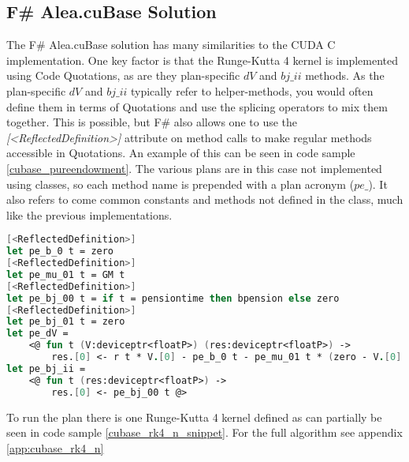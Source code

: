 \subsection{F\# Alea.cuBase Solution}
The F\# Alea.cuBase solution has many similarities to the CUDA C implementation.
One key factor is that the Runge-Kutta 4 kernel is implemented using Code Quotations, as are they plan-specific $dV$ and $bj\_ii$ methods.
As the plan-specific $dV$ and $bj\_ii$ typically refer to helper-methods, you would often define them in terms of Quotations and use the splicing operators to mix them together.
This is possible, but F\# also allows one to use the \textit{[\textless{}ReflectedDefinition\textgreater{}]} attribute on method calls to make regular methods accessible in Quotations.
An example of this can be seen in code sample \ref{cubase_pureendowment}. 
The various plans are in this case not implemented using classes, so each method name is prepended with a plan acronym ($pe\_$).
It also refers to come common constants and methods not defined in the class, much like the previous implementations.

\begin{lstlisting}[language=FSharp, caption=The pure endowment insurance plan expressed in F\# Alea.cuBase, label=cubase_pureendowment]
[<ReflectedDefinition>] 
let pe_b_0 t = zero
[<ReflectedDefinition>]
let pe_mu_01 t = GM t
[<ReflectedDefinition>]
let pe_bj_00 t = if t = pensiontime then bpension else zero
[<ReflectedDefinition>]
let pe_bj_01 t = zero
let pe_dV = 
	<@ fun t (V:deviceptr<floatP>) (res:deviceptr<floatP>) -> 
		res.[0] <- r t * V.[0] - pe_b_0 t - pe_mu_01 t * (zero - V.[0] + pe_bj_01 t) @>
let pe_bj_ii = 
	<@ fun t (res:deviceptr<floatP>) ->
		res.[0] <- pe_bj_00 t @>
\end{lstlisting}

To run the plan there is one Runge-Kutta 4 kernel defined as can partially be seen in code sample \ref{cubase_rk4_n_snippet}. For the full algorithm see appendix \ref{app:cubase_rk4_n}

